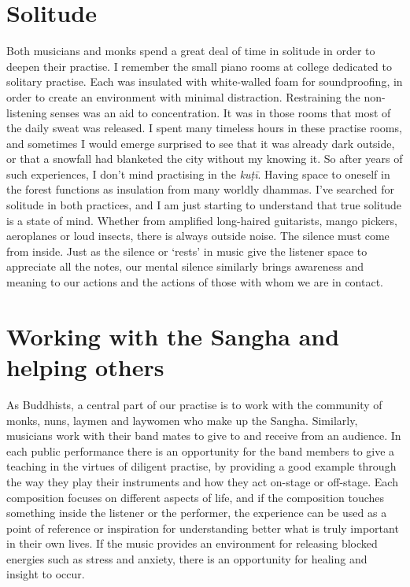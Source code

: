 \section{Solitude}

Both musicians and monks spend a great deal of time in solitude in order
to deepen their practise. I remember the small piano rooms at college
dedicated to solitary practise. Each was insulated with white-walled
foam for soundproofing, in order to create an environment with minimal
distraction. Restraining the non-listening senses was an aid to
concentration. It was in those rooms that most of the daily sweat was
released. I spent many timeless hours in these practise rooms, and
sometimes I would emerge surprised to see that it was already dark
outside, or that a snowfall had blanketed the city without my knowing
it. So after years of such experiences, I don't mind practising in the
\emph{kuṭī}. Having space to oneself in the forest functions as
insulation from many worldly dhammas. I've searched for solitude in both
practices, and I am just starting to understand that true solitude is a
state of mind. Whether from amplified long-haired guitarists, mango
pickers, aeroplanes or loud insects, there is always outside noise. The
silence must come from inside. Just as the silence or `rests' in music
give the listener space to appreciate all the notes, our mental silence
similarly brings awareness and meaning to our actions and the actions of
those with whom we are in contact. 

\section{Working with the Sangha and helping others}

As Buddhists, a central part of our practise is to work with the
community of monks, nuns, laymen and laywomen who make up the Sangha. 
Similarly, musicians work with their band mates to give to and receive
from an audience. In each public performance there is an opportunity for
the band members to give a teaching in the virtues of diligent practise, 
by providing a good example through the way they play their instruments
and how they act on-stage or off-stage. Each composition focuses on
different aspects of life, and if the composition touches something
inside the listener or the performer, the experience can be used as a
point of reference or inspiration for understanding better what is truly
important in their own lives. If the music provides an environment for
releasing blocked energies such as stress and anxiety, there is an
opportunity for healing and insight to occur. 

